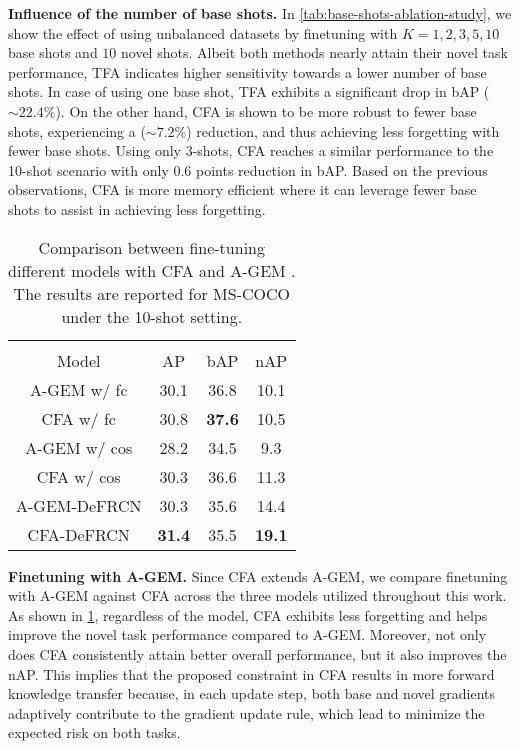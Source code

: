 \documentclass[10pt,twocolumn,letterpaper]{article}
\begin{document}
\textbf{Influence of the number of base shots.} In \cref{tab:base-shots-ablation-study}, we show the effect of using unbalanced datasets by finetuning with $K=1,2,3,5,10$ base shots and $10$ novel shots. Albeit both methods nearly attain their novel task performance, TFA indicates higher sensitivity towards a lower number of base shots. In  case of using one base shot, TFA exhibits a significant drop in bAP ($\sim22.4\%$). On the other hand, CFA is shown to be more robust to fewer base shots, experiencing a ($\sim7.2\%$) reduction, and thus achieving less forgetting with fewer base shots. Using only 3-shots, CFA reaches a similar performance to the 10-shot scenario with only $0.6$ points reduction in bAP. Based on the previous observations, CFA is more memory efficient where it can leverage fewer base shots to assist in achieving less forgetting.  
\begin{table}[t!] \centering
	\setlength{\tabcolsep}{3.0mm}
	\scalebox{0.8}
	{\begin{tabular}{c|ccc}
\toprule[1.1pt]
			\multicolumn{1}{c|}{} &\multicolumn{3}{c}{}\\
			\multicolumn{1}{c|}{\multirow{-2}{*}{Model}}  & \multicolumn{1}{c}{\multirow{-2}{*}{AP}} & \multicolumn{1}{c}{\multirow{-2}{*}{bAP}}  &  \multicolumn{1}{c}{\multirow{-2}{*}{nAP}}            \\
			\midrule[0.9pt]
			  A-GEM w/ fc & 30.1 & 36.8 & 10.1\\
			  \rowcolor[HTML]{EFEFEF}
			  CFA w/ fc & 30.8 & \textbf{37.6} & 10.5 \\\midrule[1pt]
			  A-GEM w/ cos & 28.2 & 34.5 & 9.3  \\
			  \rowcolor[HTML]{EFEFEF}
			  CFA w/ cos & 30.3 & 36.6 & 11.3 \\\midrule[1pt]
			  A-GEM-DeFRCN & 30.3 & 35.6 & 14.4 \\
			  \rowcolor[HTML]{EFEFEF}
			  CFA-DeFRCN & \textbf{31.4} & 35.5 & \textbf{19.1}\\
			  
			\bottomrule[1.1pt]
	\end{tabular}}
	\vspace{-0.2cm}
	\caption{Comparison between fine-tuning different models with CFA and A-GEM \cite{agem}. The results are reported for MS-COCO under the 10-shot setting. }
 	\vspace{-1em}
	\label{tab:cl-ablation-study}
\end{table}

 
\textbf{Finetuning with A-GEM.} Since CFA extends A-GEM, we compare finetuning with A-GEM against CFA across the three models utilized throughout this work. As shown in \cref{tab:cl-ablation-study}, regardless of the model, CFA exhibits less forgetting and helps improve the novel task performance compared to A-GEM. Moreover, not only does CFA consistently attain better overall performance, but it also improves the nAP. This implies that the proposed constraint in CFA results in more forward knowledge transfer because, in each update step, both base and novel gradients adaptively contribute to the gradient update rule, which lead to minimize the expected risk on both tasks.
\end{document}
